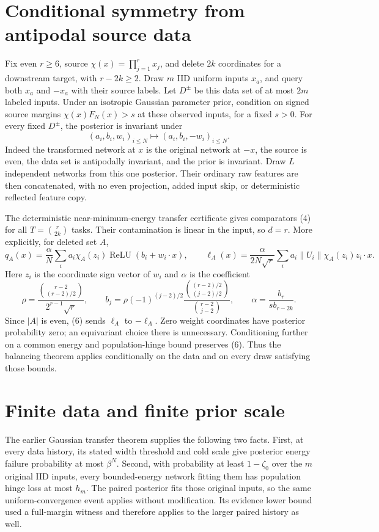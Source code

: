 \documentclass[11pt]{article}
\newcommand{\relu}{\operatorname{ReLU}}
\begin{document}
\section{Conditional symmetry from antipodal source data}
Fix even $r\ge6$, source $\chi(x)=\prod_{j=1}^r x_j$, and delete $2k$
coordinates for a downstream target, with $r-2k\ge2$. Draw $m$ IID
uniform inputs $x_a$, and query both $x_a$ and $-x_a$ with their source
labels. Let $D^\pm$ be this data set of at most $2m$ labeled inputs.
Under an isotropic Gaussian parameter prior, condition on signed source margins
$\chi(x)F_N(x)>s$ at these observed inputs, for a fixed $s>0$. For every fixed $D^\pm$, the
posterior is invariant under
\[
          (a_i,b_i,w_i)_{i\le N}\mapsto(a_i,b_i,-w_i)_{i\le N}.
 \tag{6}
\]
Indeed the transformed network at $x$ is the original network at $-x$,
the source is even, the data set is antipodally invariant, and the prior
is invariant. Draw $L$ independent networks from this one posterior.
Their ordinary raw features are then concatenated, with no even
projection, added input skip, or deterministic reflected feature copy.

The deterministic near-minimum-energy transfer certificate gives
comparators (4) for all $T=\binom r{2k}$ tasks. Their contamination is
linear in the input, so $d=r$. More explicitly, for deleted set $A$,
\[
 q_A(x)=\frac{\alpha}{N}\sum_i a_i\chi_A(z_i)
                               \relu(b_i+w_i\cdot x),
 \qquad
 \ell_A(x)=\frac{\alpha}{2N\sqrt r}
                       \sum_i a_i\|U_i\|\chi_A(z_i)z_i\cdot x.
 \tag{7}
\]
Here $z_i$ is the coordinate sign vector of $w_i$ and $\alpha$ is the
coefficient
\[
 \rho=\frac{\binom{r-2}{(r-2)/2}}{2^{r-1}\sqrt r},\qquad
 b_j=\rho(-1)^{(j-2)/2}
       \frac{\binom{(r-2)/2}{(j-2)/2}}{\binom{r-2}{j-2}},\qquad
 \alpha=\frac{b_r}{s b_{r-2k}}.
\]
Since $|A|$ is
even, (6) sends $\ell_A$ to $-\ell_A$. Zero weight coordinates have
posterior probability zero; an equivariant choice there is unnecessary.
Conditioning further on a common energy and population-hinge bound
preserves (6). Thus the balancing theorem applies conditionally on the
data and on every draw satisfying those bounds.

\section{Finite data and finite prior scale}
The earlier Gaussian transfer theorem supplies the following two facts.
First, at every data history, its stated width threshold and cold scale
give posterior energy failure probability at most $\beta^N$.
Second, with probability at least $1-\zeta_0$ over the $m$ original IID
inputs, every bounded-energy network fitting them has population hinge
loss at most $h_m$. The paired posterior fits those original inputs, so
the same uniform-convergence event applies without modification. Its
evidence lower bound used a full-margin witness and therefore applies
to the larger paired history as well.
\end{document}
